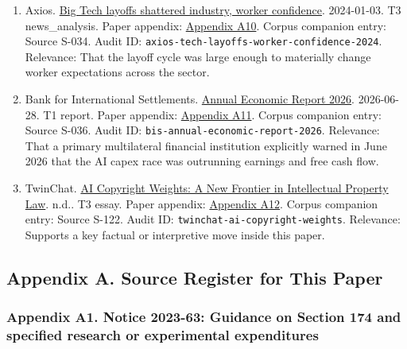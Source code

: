 \documentclass[
  american,
  11pt,
  letterpaper,
]{article}
\begin{document}
\begin{enumerate}
{  advertising rebound}. 2024-02-01. T2 news\_article. Paper appendix:
  \hyperref[appendix-a9-meta-posts-sharp-profit-revenue-increase-in-q4-thanks-to-cost-cuts-and-advertising-rebound]{Appendix
  A9}. Corpus companion entry: Source S-014. Audit ID:
  \texttt{ap-meta-q4-2023-year-of-efficiency}. Relevance: That Meta's
  improved financial results were publicly tied to both cost cutting and
  layoffs, not just to a magical AI turnaround.
\item
  Axios.
  \href{https://www.axios.com/2024/01/03/tech-layoffs-google-microsoft-employees-impact-anxiety}{Big
  Tech layoffs shattered industry, worker confidence}. 2024-01-03. T3
  news\_analysis. Paper appendix:
  \hyperref[appendix-a10-big-tech-layoffs-shattered-industry-worker-confidence]{Appendix
  A10}. Corpus companion entry: Source S-034. Audit ID:
  \texttt{axios-tech-layoffs-worker-confidence-2024}. Relevance: That
  the layoff cycle was large enough to materially change worker
  expectations across the sector.
\item
  Bank for International Settlements.
  \href{https://www.bis.org/publ/arpdf/ar2026e.pdf}{Annual Economic
  Report 2026}. 2026-06-28. T1 report. Paper appendix:
  \hyperref[appendix-a11-annual-economic-report-2026]{Appendix A11}.
  Corpus companion entry: Source S-036. Audit ID:
  \texttt{bis-annual-economic-report-2026}. Relevance: That a primary
  multilateral financial institution explicitly warned in June 2026 that
  the AI capex race was outrunning earnings and free cash flow.
\item
  TwinChat.
  \href{https://medium.com/twinchat/ai-copyright-weights-a-new-frontier-in-intellectual-property-law-d8ee1b6c55ee}{AI
  Copyright Weights: A New Frontier in Intellectual Property Law}. n.d..
  T3 essay. Paper appendix:
  \hyperref[appendix-a12-ai-copyright-weights-a-new-frontier-in-intellectual-property-law]{Appendix
  A12}. Corpus companion entry: Source S-122. Audit ID:
  \texttt{twinchat-ai-copyright-weights}. Relevance: Supports a key
  factual or interpretive move inside this paper.
\end{enumerate}

\subsection{Appendix A. Source Register for This
Paper}\label{appendix-a.-source-register-for-this-paper}

\subsubsection{Appendix A1. Notice 2023-63: Guidance on Section 174 and
specified research or experimental
expenditures}\label{appendix-a1-notice-2023-63-guidance-on-section-174-and-specified-research-or-experimental-expenditures}
\end{document}
